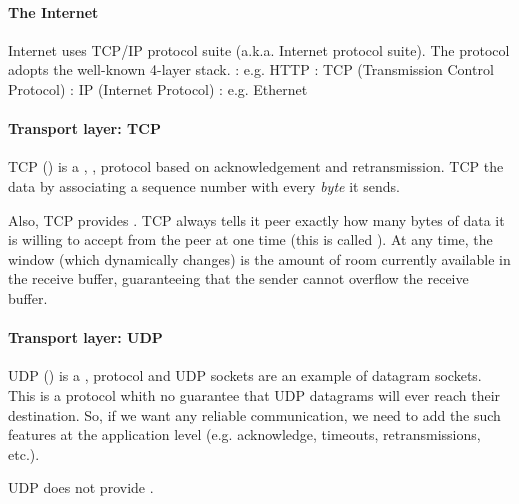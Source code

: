 \documentclass{memo}
\begin{document}
\small
{}

\paragraph{The Internet}
Internet uses TCP/IP protocol suite (a.k.a. Internet protocol suite).
The protocol adopts the well-known 4-layer stack.
\bit
\w {}: e.g. HTTP
\w {}: TCP (Transmission Control Protocol)
\w {}: IP (Internet Protocol)
\w {}: e.g. Ethernet
\eit

\paragraph{Transport layer: TCP}
TCP () is a ,
,  protocol based on acknowledgement and
retransmission.  TCP  the data by associating a sequence number
with every {\em byte\/} it sends. 

Also, TCP provides . TCP always tells it peer exactly how
many bytes of data it is willing to accept from the peer at one time (this is
called ). At any time, the window (which dynamically
changes) is the amount of room currently available in the receive buffer,
guaranteeing that the sender cannot overflow the receive buffer. 

\paragraph{Transport layer: UDP}
UDP () is a , 
protocol and UDP sockets are an example of datagram sockets.  This is a
 protocol whith no guarantee that
UDP datagrams will ever reach their destination. 
So, if we want any reliable communication, we need to add the such features at
the application level (e.g. acknowledge, timeouts, retransmissions, etc.).

UDP does not provide . 
\end{document}
